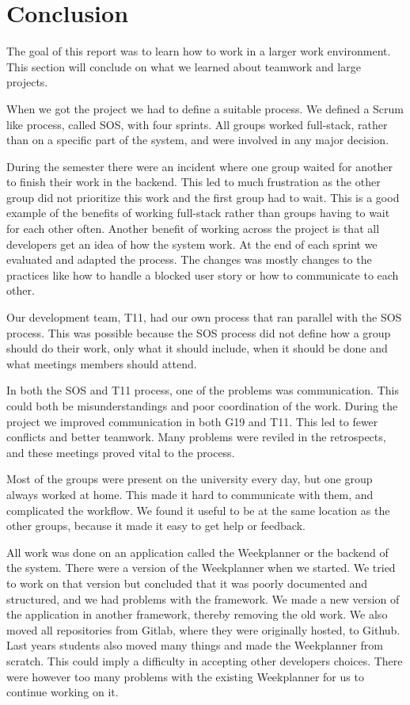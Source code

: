 \section{Conclusion}
The goal of this report was to learn how to work in a larger work environment. This section will conclude on what we learned about teamwork and large projects. 

When we got the project we had to define a suitable process. We defined a Scrum like process, called \gls{SOS}, with four sprints. All groups worked full-stack, rather than on a specific part of the system, and were involved in any major decision. 

During the semester there were an incident where one group waited for another to finish their work in the backend. This led to much frustration as the other group did not prioritize this work and the first group had to wait. This is a good example of the benefits of working full-stack rather than groups having to wait for each other often. Another benefit of working across the project is that all developers get an idea of how the system work.
At the end of each sprint we evaluated and adapted the process. The changes was mostly changes to the practices like how to handle a blocked user story or how to communicate to each other.

Our development team, \gls{T11}, had our own process that ran parallel with the \gls{SOS} process. This was possible because the \gls{SOS} process did not define how a group should do their work, only what it should include, when it should be done and what meetings members should attend. 

In both the \gls{SOS} and \gls{T11} process, one of the problems was communication. This could both be misunderstandings and poor coordination of the work. During the project we improved communication in both \gls{G19} and \gls{T11}. This led to fewer conflicts and better teamwork. Many problems were reviled in the retrospects, and these meetings proved vital to the process. 

Most of the groups were present on the university every day, but one group always worked at home. This made it hard to communicate with them, and complicated the workflow. We found it useful to be at the same location as the other groups, because it made it easy to get help or feedback.

All work was done on an application called the Weekplanner or the backend of the system. There were a version of the Weekplanner when we started. We tried to work on that version but concluded that it was poorly documented and structured, and we had problems with the framework. We made a new version of the application in another framework, thereby removing the old work. We also moved all repositories from Gitlab, where they were originally hosted, to Github. Last years students also moved many things and made the Weekplanner from scratch. This could imply a difficulty in accepting other developers choices. There were however too many problems with the existing Weekplanner for us to continue working on it. 


